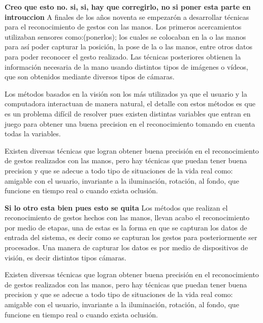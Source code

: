 \textbf{Creo que esto no. si, si, hay que corregirlo, no si poner esta parte en introuccion} 
A finales de los años noventa se empezar\'on a desarrollar t\'ecnicas para  el reconocimiento de gestos con las manos. Los primeros acercamientos utilizaban sensores como:(ponerlos); los cuales se colocaban en la o las manos para así poder capturar la posición, la pose de la o las manos, entre otros datos para poder reconocer el gesto realizado. 
Las técnicas posteriores obtienen la información necesaria de la mano usando distintos tipos de imágenes o vídeos, que son obtenidos mediante diversos tipos de cámaras.

Los métodos basados en la visión son los más utilizados ya que el usuario y la computadora interactuan de manera natural, el detalle con estos métodos es que es un problema difícil de resolver pues existen distintas variables que entran en juego para obtener una buena precision en el reconocimiento tomando en cuenta todas la variables. 

Existen diversas técnicas que logran obtener buena precisión en el reconocimiento de gestos realizados con las manos, pero hay técnicas que puedan tener buena precision y que se adecue a todo tipo de situaciones de la vida real como: amigable con el usuario, invariante a la iluminación, rotación, al fondo, que funcione en tiempo real o cuando exista oclusión.

\textbf{Si lo otro esta bien pues esto se quita}
Los métodos que realizan el reconocimiento de gestos hechos con las manos, llevan acabo el reconocimiento por medio de etapas, una de estas es la forma en que se capturan los datos de entrada del sistema, es decir como se capturan los gestos para posteriormente ser procesados. Una manera de capturar los datos es por medio de dispositivos de visión, es decir distintos tipos cámaras. 

Existen diversas técnicas que logran obtener buena precisión en el reconocimiento de gestos realizados con las manos, pero hay técnicas que puedan tener buena precision y que se adecue a todo tipo de situaciones de la vida real como: amigable con el usuario, invariante a la iluminación, rotación, al fondo, que funcione en tiempo real o cuando exista oclusión.



